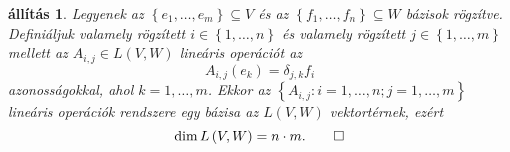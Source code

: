 \documentclass[9pt, showtrims]{memoir}
\theoremstyle{plain}
\newtheorem{proposition}{állítás}[section]
\theoremstyle{remark}
\theoremstyle{definition}
\begin{document}
\begin{proposition}
    Legyenek az $\left\{ e_1,\dots,e_m \right\}\subseteq V$ és az
    $\left\{ f_1,\dots,f_n \right\}\subseteq W$ bázisok rögzítve.
    Definiáljuk valamely rögzített $i\in\left\{ 1,\dots,n \right\}$ és valamely rögzített
    $j\in \left\{ 1,\dots,m \right\}$ mellett az $A_{i,j}\in L\left( V,W \right)$ lineáris operációt az
    \begin{equation}
        A_{i,j}\left( e_k \right)=\delta_{j,k}f_i
        \label{eq:aij}
    \end{equation}
    azonosságokkal, ahol $k=1,\dots,m$.
    Ekkor az $\left\{ A_{i,j}: i=1,\dots,n;j=1,\dots,m \right\}$
    lineáris operációk rendszere egy bázisa az $L\left( V,W \right)$ vektortérnek,
    ezért 
    \[
        \dim L\left( V,W \right)=n\cdot m.\qedhere
    \]
\end{proposition}
\end{document}
